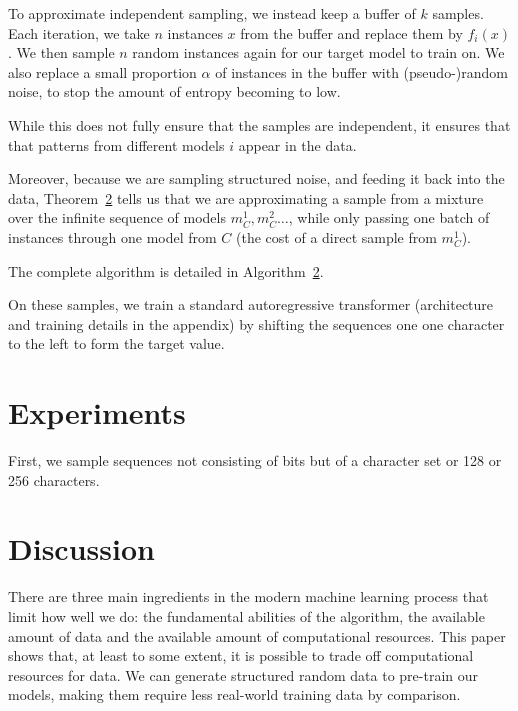 \documentclass{article} %
\begin{document}
To approximate independent sampling, we instead keep a buffer of $k$ samples. Each iteration, we take $n$ instances $x$ from the buffer and replace them by $f_i(x)$. We then sample $n$ random instances again for our target model to train on. We also replace a small proportion $\alpha$ of instances in the buffer with (pseudo-)random noise, to stop the amount of entropy becoming to low.

While this does not fully ensure that the samples are independent, it ensures that that patterns from different models $i$ appear in the data. 

Moreover, because we are sampling structured noise, and feeding it back into the data, Theorem~\ref{} tells us that we are approximating a sample from a mixture over the infinite sequence of models $m^1_C, m^2_C\ldots$, while only passing one batch of instances through one model from $C$ (the cost of a direct sample from $m^1_C$).\footnotemark
{}

The complete algorithm is detailed in Algorithm~\ref{}.

On these samples, we train a standard autoregressive transformer (architecture and training details in the appendix) by shifting the sequences one one character to the left to form the target value.


\section{Experiments}


First, we sample sequences not consisting of bits but of a character set or 128 or 256 characters.\footnotemark 



\section{Discussion}

There are three main ingredients in the modern machine learning process that limit how well we do: the fundamental abilities of the algorithm, the available amount of data and the available amount of computational resources. This paper shows that, at least to some extent, it is possible to trade off computational resources for data. We can generate structured random data to pre-train our models, making them require less real-world training data by comparison.
\end{document}
